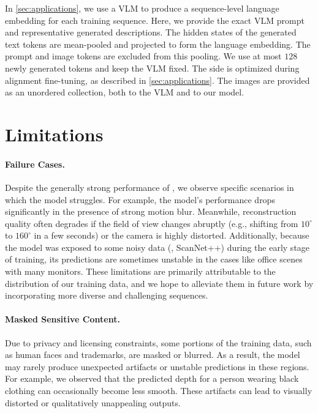 In \cref{sec:applications}, we use a VLM to produce a sequence-level language embedding for each training sequence.
Here, we provide the exact VLM prompt and representative generated descriptions.
The hidden states of the generated text tokens are mean-pooled and projected to form the language embedding.
The prompt and image tokens are excluded from this pooling.
We use at most \(128\) newly generated tokens and keep the VLM fixed.
The \method side is optimized during alignment fine-tuning, as described in \cref{sec:applications}.
The images are provided as an unordered collection, both to the VLM and to our model.




\section{Limitations}%
\label{sec:limitation}

\paragraph{Failure Cases.}

Despite the generally strong performance of \method, we observe specific scenarios in which the model struggles. 
For example, the model's performance drops significantly in the presence of strong motion blur. 
Meanwhile, reconstruction quality often degrades if the field of view changes abruptly (e.g., shifting from $10^\circ$ to $160^\circ$ in a few seconds) or the camera is highly distorted. 
Additionally, because the model was exposed to some noisy data (\eg, ScanNet++) during the early stage of training, its predictions are sometimes unstable in the cases like office scenes with many monitors. 
These limitations are primarily attributable to the distribution of our training data, and we hope to alleviate them in future work by incorporating more diverse and challenging sequences.



\paragraph{Masked Sensitive Content.}

Due to privacy and licensing constraints, some portions of the training data, such as human faces and trademarks, are masked or blurred.
As a result, the model may rarely produce unexpected artifacts or unstable predictions in these regions. For example, we observed that the predicted depth for a person wearing black clothing can occasionally become less smooth.
These artifacts can lead to visually distorted or qualitatively unappealing outputs.





